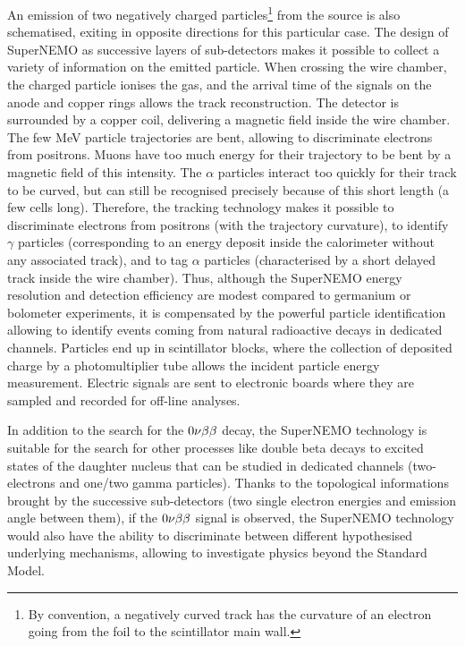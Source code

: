 An emission of two negatively charged particles\footnote{By convention, a negatively curved track has the curvature of an electron going from the foil to the scintillator main wall.} from the source is also schematised, exiting in opposite directions for this particular case.
The design of SuperNEMO as successive layers of sub-detectors makes it possible to collect a variety of information on the emitted particle.
When crossing the wire chamber, the charged particle ionises the gas, and the arrival time of the signals on the anode and copper rings allows the track reconstruction.
The detector is surrounded by a copper coil, delivering a magnetic field inside the wire chamber.
The few MeV particle trajectories are bent, allowing to discriminate electrons from positrons.
Muons have too much energy for their trajectory to be bent by a magnetic field of this intensity.
The $\alpha$ particles interact too quickly for their track to be curved, but can still be recognised precisely because of this short length (a few cells long).
Therefore, the tracking technology makes it possible to discriminate electrons from positrons (with the trajectory curvature), to identify $\gamma$ particles (corresponding to an energy deposit inside the calorimeter without any associated track), and to tag $\alpha$ particles (characterised by a short delayed track inside the wire chamber).
Thus, although the SuperNEMO energy resolution and detection efficiency are modest compared to germanium or bolometer experiments, it is compensated by the powerful particle identification allowing to identify events coming from natural radioactive decays in dedicated channels.
Particles end up in scintillator blocks, where the collection of deposited charge by a photomultiplier tube allows the incident particle energy measurement.
Electric signals are sent to electronic boards where they are sampled and recorded for off-line analyses.

In addition to the search for the $0\nu\beta\beta$ decay, the SuperNEMO technology is suitable for the search for other processes like double beta decays to excited states of the daughter nucleus that can be studied in dedicated channels (two-electrons and one/two gamma particles).
Thanks to the topological informations brought by the successive sub-detectors (two single electron energies and emission angle between them), if the $0\nu\beta\beta$ signal is observed, the SuperNEMO technology would also have the ability to discriminate between different hypothesised underlying mechanisms, allowing to investigate physics beyond the Standard Model.

